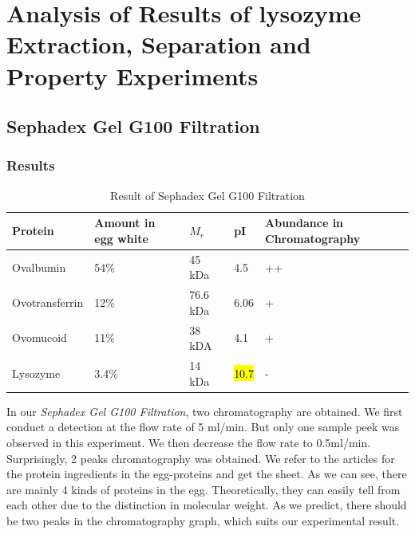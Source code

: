 % 
%
%
% 
%

\chapter{Analysis of Results of lysozyme Extraction, Separation and Property Experiments}

\hypertarget{header-n0}{%
	\section{Sephadex Gel G100 Filtration}\label{header-n0}}

\subsection{Results}

\begin{table}[!h]
	\centering
	\caption{Result of Sephadex Gel G100 Filtration}
	\begin{tabular}{@{}lllll@{}}
	\toprule
	Protein & Amount in egg white & \(M_{r}\) & pI & Abundance
	in Chromatography\\
	\midrule
	Ovalbumin & 54\% & 45 kDa & 4.5 & ++\\
	Ovotransferrin & 12\% & 76.6 kDa & 6.06 & +\\
	Ovomucoid & 11\% & 38 kDA & 4.1 & +\\
	Lysozyme & 3.4\% & 14 kDa & \hl{10.7} & -\\
	\bottomrule
	\end{tabular}
\end{table}

In our \emph{Sephadex Gel G100 Filtration}, two chromatography are
obtained. We first conduct a detection at the flow rate of 5 ml/min. But
only one sample peek was observed in this experiment. We then decrease
the flow rate to 0.5ml/min. Surprisingly, 2 peaks chromatography was
obtained. We refer to the articles for the protein ingredients in the
egg-proteins and get the sheet. As we can see, there are mainly 4 kinds of
proteins in the egg. Theoretically, they can easily tell from each other
due to the distinction in molecular weight. As we predict, there should
be two peaks in the chromatography graph, which suits our experimental
result.

